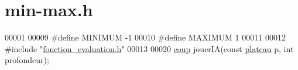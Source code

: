 \hypertarget{min-max_8h_source}{
\section{min-\/max.h}
}

\begin{DoxyCode}
00001 
00009 \textcolor{preprocessor}{#define MINIMUM -1}
00010 \textcolor{preprocessor}{}\textcolor{preprocessor}{#define MAXIMUM 1}
00011 \textcolor{preprocessor}{}
00012 \textcolor{preprocessor}{#include "\hyperlink{fonction__evaluation_8h}{fonction_evaluation.h}"}
00013 
00020 \hyperlink{structcoup}{coup} jouerIA(\textcolor{keyword}{const} \hyperlink{structplateau}{plateau} p, \textcolor{keywordtype}{int} profondeur);
\end{DoxyCode}
